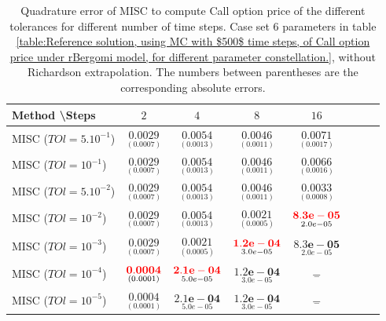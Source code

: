 \documentclass[11pt]{article}
\begin{document}
\begin{table}[h!]
	\centering
	\begin{tabular}{l*{6}{c}r}
		Method \textbackslash  Steps            & $2$ & $4$ & $8$ & $16$  \\
		\hline
		MISC ($TOl=5.10^{-1}$)  & $\underset{(   0.0007)}{\mathbf{   0.0029}}$ & $\underset{(
			
			0.0013)}{\mathbf{     0.0054}}$ & $\underset{( 
			0.0011)}{\mathbf{   0.0046}}$ & $\underset{(      0.0017)}{\mathbf{     0.0071
		}}$  \\
		MISC ($TOl=10^{-1}$)  & $\underset{(   0.0007)}{\mathbf{   0.0029}}$ & $\underset{(
			
			0.0013)}{\mathbf{     0.0054}}$& $\underset{( 
			0.0011)}{\mathbf{   0.0046}}$  & $\underset{(    0.0016)}{\mathbf{     0.0066
		}}$   \\
		MISC ($TOl=5.10^{-2}$)  &$\underset{(   0.0007)}{\mathbf{   0.0029}}$ & $\underset{(
			
			0.0013)}{\mathbf{     0.0054}}$ & $\underset{( 
			0.0011)}{\mathbf{   0.0046}}$  & $\underset{(0.0008)}{\mathbf{
				0.0033}}$  \\
		MISC ($TOl=10^{-2}$)  & $\underset{(   0.0007)}{\mathbf{   0.0029}}$ &$\underset{(
			
			0.0013)}{\mathbf{     0.0054}}$ & $\underset{(0.0005)}{\mathbf{    0.0021
		}}$ &  $\underset{2.0e-05}{\mathbf{\red{8.3e-05}}}$  \\
		MISC ($TOl=10^{-3}$)  & $\underset{(   0.0007)}{\mathbf{   0.0029}}$ & $\underset{(0.0005
			)}{\mathbf{ 
				0.0021
		}}$ & $\underset{3.0e-05}{\mathbf{\red{1.2e-04}}}$ &  $\underset{2.0e-05}{\mathbf{8.3e-05}}$  \\
		MISC ($TOl=10^{-4}$)  & $\underset{( 0.0001)}{\mathbf{    \red{0.0004}}}$ & $\underset{5.0e-05}{\mathbf{\red{2.1e-04}}}$& $\underset{3.0e-05}{\mathbf{1.2e-04}}$ & $\underset{-}{\mathbf{-}}$  \\
		
		MISC ($TOl=10^{-5}$)  & $\underset{( 0.0001)}{\mathbf{   0.0004}}$ & $\underset{5.0e-05}{\mathbf{2.1e-04}}$& $\underset{3.0e-05}{\mathbf{1.2e-04}}$& $\underset{-}{\mathbf{-}}$  \\
		
		\hline
		
	\end{tabular}
	\caption{Quadrature error of MISC to compute Call option price of the different tolerances for different number of time steps. Case  set $6$ parameters in table \ref{table:Reference solution, using MC with $500$ time steps, of Call option price under rBergomi model, for different parameter constellation.}, without Richardson extrapolation. The numbers between parentheses are the corresponding absolute errors.}
	\label{Quadrature error of MISC to compute Call option price of the different tolerances for different number of time steps. Case  set $6$ parameters, without Richardson extrapolation. The numbers between parentheses are the corresponding absolute errors.}
\end{table}
\end{document}
